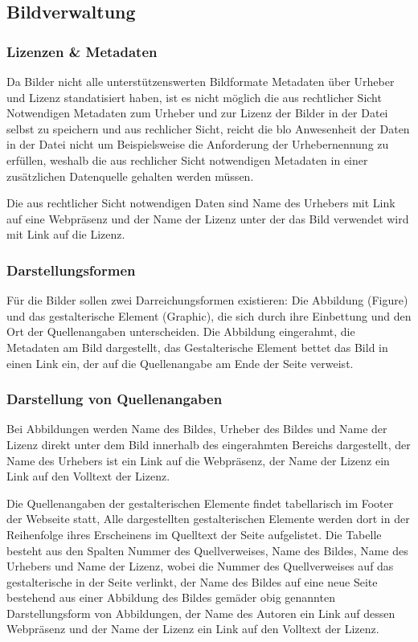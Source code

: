 \subsection{Bildverwaltung}



\subsubsection{Lizenzen \& Metadaten}

Da Bilder nicht alle unterst\"{u}tzenswerten Bildformate Metadaten \"{u}ber
Urheber und Lizenz standatisiert haben, ist es nicht m\"{o}glich die aus
rechtlicher Sicht Notwendigen Metadaten zum Urheber und zur Lizenz der Bilder
in der Datei selbst zu speichern und aus rechlicher Sicht, reicht die blo\sze
Anwesenheit der Daten in der Datei nicht um Beispielsweise die Anforderung der
Urhebernennung zu erf\"{u}llen, weshalb die aus rechlicher Sicht notwendigen
Metadaten in einer zus\"{a}tzlichen Datenquelle gehalten werden m\"{u}ssen.

Die aus rechtlicher Sicht notwendigen Daten sind Name des Urhebers mit Link auf
eine Webpr\"{a}senz und der Name der Lizenz unter der das Bild verwendet wird
mit Link auf die Lizenz.

\subsubsection{Darstellungsformen}

F\"{u}r die Bilder sollen zwei Darreichungsformen existieren: Die Abbildung
(Figure) und das gestalterische Element (Graphic), die sich durch ihre
Einbettung und den Ort der Quellenangaben unterscheiden. Die Abbildung
eingerahmt, die Metadaten am Bild dargestellt, das Gestalterische Element bettet
das Bild in einen Link ein, der auf die Quellenangabe am Ende der Seite verweist.

\subsubsection{Darstellung von Quellenangaben}

Bei Abbildungen werden Name des Bildes, Urheber des Bildes und Name der Lizenz
direkt unter dem Bild innerhalb des eingerahmten Bereichs dargestellt, der Name
des Urhebers ist ein Link auf die Webpr\"{a}senz, der Name der Lizenz ein Link
auf den Volltext der Lizenz.

Die Quellenangaben der gestalterischen Elemente findet tabellarisch im Footer der
Webseite statt, Alle dargestellten gestalterischen Elemente werden dort in der
Reihenfolge ihres Erscheinens im Quelltext der Seite aufgelistet. Die Tabelle
besteht aus den Spalten Nummer des Quellverweises, Name des Bildes,
Name des Urhebers und Name der Lizenz, wobei die Nummer des Quellverweises auf
das gestalterische in der Seite verlinkt, der Name des Bildes auf eine neue
Seite bestehend aus einer Abbildung des Bildes gem\"{a}\sz der obig genannten
Darstellungsform von Abbildungen, der Name des Autoren ein Link auf dessen
Webpr\"{a}senz und der Name der Lizenz ein Link auf den Volltext der Lizenz.

